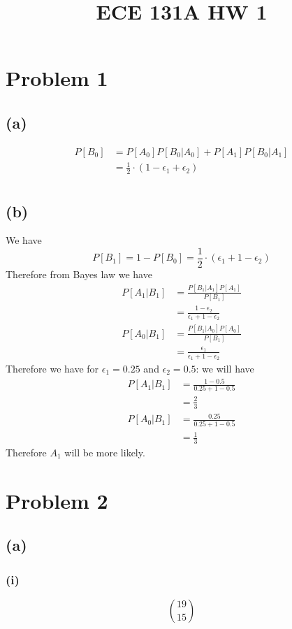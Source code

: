 
\title{ECE 131A HW 1}

\maketitle
\section*{Problem 1}
\subsection*{(a)}
\begin{align*}
    P[B_0]&=P[A_0]P[B_0|A_0]+P[A_1]P[B_0|A_1]\\
    &=\boxed{\frac{1}{2}\cdot(1-\epsilon_1+\epsilon_2)}\\
\end{align*}
\subsection*{(b)}
We have 
$$P[B_1]=1-P[B_0]=\frac{1}{2}\cdot(\epsilon_1+1-\epsilon_2)$$
Therefore from Bayes law we have
\begin{align*}
    P[A_1|B_1]&=\frac{P[B_1|A_1]P[A_1]}{P[B_1]}\\
    &=\frac{1-\epsilon_2}{\epsilon_1+1-\epsilon_2}
\end{align*}
\begin{align*}
    P[A_0|B_1]&=\frac{P[B_1|A_0]P[A_0]}{P[B_1]}\\
    &=\frac{\epsilon_1}{\epsilon_1+1-\epsilon_2}
\end{align*}
Therefore we have for $\epsilon_1=0.25$ and $\epsilon_2=0.5$:
we will have
\begin{align*}
    P[A_1|B_1]&=\frac{1-0.5}{0.25+1-0.5}\\
    &=\frac{2}{3}\\
    P[A_0|B_1]&=\frac{0.25}{0.25+1-0.5}\\
    &=\frac{1}{3}
\end{align*}
Therefore $A_1$ will be more likely. 
\section*{Problem 2}
\subsection*{(a)}
\subsubsection*{(i)}
$$\boxed{19 \choose 15}$$
